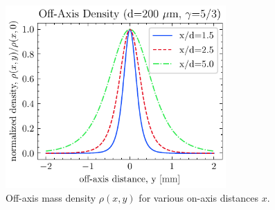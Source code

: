 \begin{figure}
	\centering
	\includegraphics[width=0.75\textwidth]{figures/chap3/off_axis_density.pdf}
	\caption{Off-axis mass density $\rho(x,y)$ for various on-axis distances $x$.}
	\label{fig:off_axis_density}
\end{figure}

%


